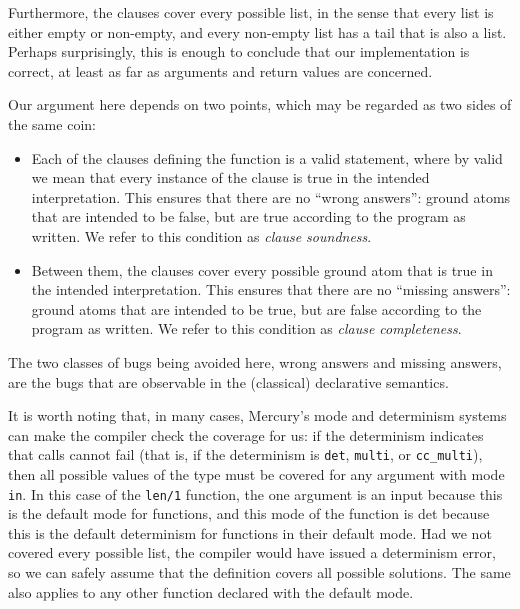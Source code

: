 Furthermore,
the clauses cover every possible list,
in the sense that every list is either empty or non-empty,
and every non-empty list has a tail that is also a list.
Perhaps surprisingly,
this is enough to conclude that our implementation is correct,
at least as far as arguments and return values are concerned.

Our argument here depends on two points,
which may be regarded as two sides of the same coin:
\begin{itemize}
\item
Each of the clauses defining the function is a valid statement,
where by valid we mean that every instance of the clause
is true in the intended interpretation.
This ensures that there are no ``wrong answers\label{gi:wrong-answer}'':
ground atoms that are intended to be false,
but are true according to the program as written.
We refer to this condition as
\emph{clause soundness\label{gi:clause-soundness}}.
\item
Between them,
the clauses cover every possible ground atom
that is true in the intended interpretation.
This ensures that there are no ``missing answers\label{gi:missing-answer}'':
ground atoms that are intended to be true,
but are false according to the program as written.
We refer to this condition as
\emph{clause completeness\label{gi:clause-completeness}}.
\end{itemize}
The two classes of bugs being avoided here,
wrong answers and missing answers,
are the bugs that are observable in
the (classical) declarative semantics.

It is worth noting that, in many cases,
Mercury's mode and determinism systems can
make the compiler check the coverage for us:
if the determinism indicates that calls cannot fail
(that is, if the determinism is
\texttt{det}, \texttt{multi}, or \texttt{cc\_multi}),
then all possible values of the type must be covered
for any argument with mode \texttt{in}.
In this case of the \texttt{len/1} function,
the one argument is an input
because this is the default mode for functions,
and this mode of the function is det
because this is the default determinism
for functions in their default mode.
Had we not covered every possible list,
the compiler would have issued a determinism error,
so we can safely assume that
the definition covers all possible solutions.
The same also applies to any other function declared with
the default mode.

